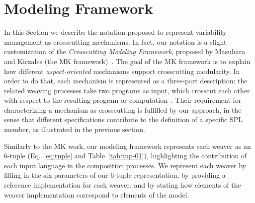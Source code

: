 \documentclass{acm_proc_article-sp}
\begin{document}
%



\section{Modeling Framework}\label{sec:modeling-framework}

In this Section we describe the notation proposed to represent variability
management as crosscutting mechanisms. In fact, our notation is a slight
customization of the \emph{Crosscutting Modeling Framework}, proposed by Masuhara
and Kiczales (the MK framework)~\cite{Masuhara:2003aa}. The goal of the MK
framework is to explain how different \emph{aspect-oriented} mechanisms support
crosscutting modularity. In order to do that, each mechanism is represented as a
three-part description: the related weaving processes take two programs as input,
which crosscut each other with respect to the resulting program or
computation~\cite{Masuhara:2003aa}.
Their requirement for characterizing a mechanism as crosscutting is fulfilled by
our approach, in the sense that different specifications contribute to the
definition of a specific SPL member, as illustrated in the previous section. 


Similarly to the MK work, our modeling framework represents each
weaver as an 6-tuple (Eq.~\ref{eq:tuple} and Table~\ref{tab:tup-01}),
highlighting the contribution of each input language in the composition
processes. We represent each weaver by filling in the six parameters of our
6-tuple representation, by providing a reference implementation for each weaver,
and by stating how elements of the weaver implementation correspond to elements
of the model.
\end{document}
